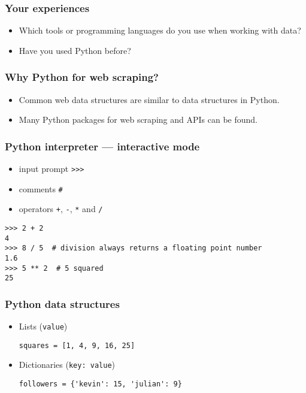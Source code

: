 
\begin{frame}
    \frametitle{Your experiences}
    \begin{itemize}
        \item Which tools or programming languages do you use when
        working with data?
        \item Have you used Python before?
    \end{itemize}
\end{frame}

\begin{frame}
    \frametitle{Why Python for web scraping?}
    \begin{itemize}
        \item<1:> Common web data structures are similar to data
        structures in Python.
        \item<2:> Many Python packages for web scraping and APIs can be
        found.
    \end{itemize}
\end{frame}

\begin{frame}[fragile]
    \frametitle{Python interpreter --- interactive mode}
    \begin{itemize}
        \item input prompt \texttt{>>>}
        \item comments \texttt{#}
        \item operators \texttt{+}, \texttt{-}, \texttt{*} and \texttt{/}
    \end{itemize}
\begin{verbatim}
>>> 2 + 2
4
>>> 8 / 5  # division always returns a floating point number
1.6
>>> 5 ** 2  # 5 squared
25
\end{verbatim}
\end{frame}

\begin{frame}[fragile]
    \frametitle{Python data structures}
    \begin{itemize}
        \item Lists (\texttt{value})\\
\begin{verbatim}
squares = [1, 4, 9, 16, 25]
\end{verbatim}
        \item Dictionaries (\texttt{key: value})\\
\begin{verbatim}
followers = {'kevin': 15, 'julian': 9}
\end{verbatim}
    \end{itemize}
\end{frame}

